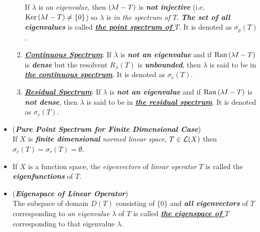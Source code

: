 \documentclass[11pt]{article}
\begin{document}
\begin{itemize}
\begin{definition}
\begin{enumerate}
If $\lambda$ is an \emph{eigenvalue}, then $\left(\lambda I - T\right)$ is \emph{\textbf{not injective}} (i.e. $\text{Ker}\left(\lambda I - T\right) \neq \left\{0\right\}$) so $\lambda$ is \emph{in the spectrum of $T$}. \emph{\textbf{The set of all eigenvalues}} is called \underline{\emph{\textbf{the point spectrum of $T$}}}. It is denoted as $\sigma_{p}(T)$. 

\item \underline{\textbf{\emph{Continuous Spectrum}}}: If $\lambda$ is \emph{\textbf{not an eigenvalue}} and if $\text{Ran}\left(\lambda I - T\right)$ is \emph{\textbf{dense}} but the resolvent $R_{\lambda}(T)$ is \emph{\textbf{unbounded}}, then $\lambda$ is said to  be in \underline{\emph{\textbf{the continuous spectrum}}}. It is denoted as $\sigma_{c}(T)$. 

\item \underline{\textbf{\emph{Residual Spectrum}}}: If $\lambda$ is \emph{\textbf{not an eigenvalue}} and if $\text{Ran}\left(\lambda I - T\right)$ is \emph{\textbf{not dense}}, then $\lambda$ is said to  be in \underline{\emph{\textbf{the residual spectrum}}}. It is denoted as $\sigma_{r}(T)$. 
\end{enumerate} 
\end{definition}

\item \begin{remark} (\emph{\textbf{Pure Point Spectrum for Finite Dimensional Case}})\\
If $X$ is \emph{\textbf{finite dimensional} normed linear space}, $T \in {\mathcal L}(X)$ then $\sigma_{c}(T) = \sigma_{r}(T) = \emptyset$.
\end{remark}

\item \begin{remark}
If $X$ is a function space, the \emph{eigenvectors} of \emph{linear operator} $T$ is called the \emph{\textbf{eigenfunctions}} of $T$.
\end{remark}

\item \begin{definition} (\emph{\textbf{Eigenspace of Linear Operator}})\\
The subspace of domain $D(T)$ consisting of $\{0\}$ and \emph{\textbf{all eigenvectors}} of $T$ corresponding to \emph{an eigenvalue} $\lambda$ of $T$ is
called  \underline{\textbf{\emph{the eigenspace of $T$}}} corresponding to that eigenvalue $\lambda$.
\end{definition}


\end{itemize}
\end{document}
